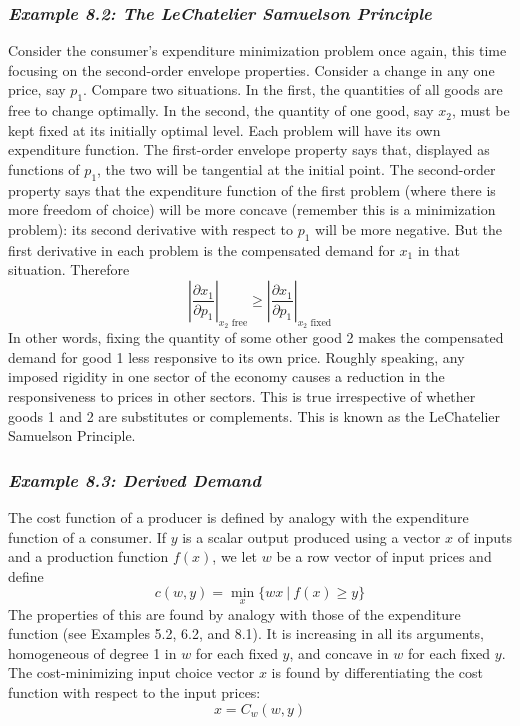 \subsubsection*{\textit{Example 8.2: The LeChatelier Samuelson Principle}}

Consider the consumer's expenditure minimization problem once again, this time focusing on the second-order envelope properties. Consider a change in any one price, say $p_1$. Compare two situations. In the first, the quantities of all goods are free to change optimally. In the second, the quantity of one good, say $x_2$, must be kept fixed at its initially optimal level. Each problem will have its own expenditure function. The first-order envelope property says that, displayed as functions of $p_1$, the two will be tangential at the initial point. The second-order property says that the expenditure function of the first problem (where there is more freedom of choice) will be more concave (remember this is a minimization problem): its second derivative with respect to $p_1$ will be more negative. But the first derivative in each problem is the compensated demand for $x_1$ in that situation. Therefore
\begin{equation*} %
  \left| \dfrac{\partial x_1}{\partial p_1} \right|_{x_2 \mbox{\ free}} \geq  \left| \dfrac{\partial x_1}{\partial p_1} \right|_{x_2 \mbox{\ fixed}}
\end{equation*}
In other words, fixing the quantity of some other good 2 makes the compensated demand for good 1 less responsive to its own price. Roughly speaking, any imposed rigidity in one sector of the economy causes a reduction in the responsiveness to prices in other sectors. This is true irrespective of whether goods 1 and 2 are substitutes or complements. This is known as the LeChatelier Samuelson Principle.

\subsubsection*{\textit{Example 8.3: Derived Demand}}

The cost function of a producer is defined by analogy with the expenditure function of a consumer. If $y$ is a scalar output produced using a vector $x$ of inputs and a production function $f(x)$, we let $w$ be a row vector of input prices and define
\begin{equation}  \label{equa8.17}
 c(w,y) = \min\limits_x \{ wx \ | \ f(x) \geq y    \}
\end{equation}
The properties of this are found by analogy with those of the expenditure function (see Examples 5.2, 6.2, and 8.1). It is increasing in all its arguments, homogeneous of degree 1 in $w$ for each fixed $y$, and concave in $w$ for each fixed $y$. The cost-minimizing input choice vector $x$ is found by differentiating the cost function with respect to the input prices:
\begin{equation} \label{equa8.18}
   x = C_w(w,y)
\end{equation}

